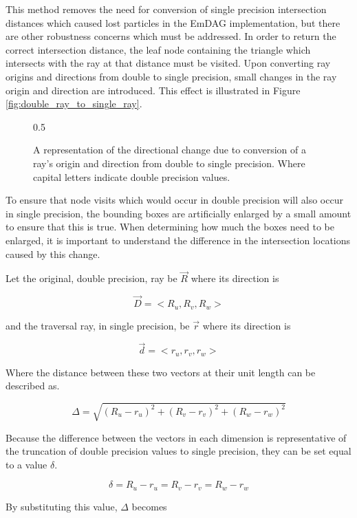 This method removes the need for conversion of single precision intersection
distances which caused lost particles in the EmDAG implementation, but there are
other robustness concerns which must be addressed. In order to return the
correct intersection distance, the leaf node containing the triangle which
intersects with the ray at that distance must be visited. Upon converting ray
origins and directions from double to single precision, small changes in the ray
origin and direction are introduced. This effect is illustrated in Figure
\ref{fig:double_ray_to_single_ray}.

\begin{figure}
  \begin{center}
  {0.5\textwidth}
  \caption{A representation of the directional change due to conversion of a
    ray's origin and direction from double to single precision. Where capital
    letters indicate double precision values.}
  \end{center}
  \label{fig:double_to_single_ray}
\end{figure}

To ensure that node visits which would occur in double precision will also occur
in single precision, the bounding boxes are artificially enlarged by a small
amount to ensure that this is true. When determining how much the boxes need to
be enlarged, it is important to understand the difference in the intersection
locations caused by this change.

Let the original, double precision, ray be $\vec{R}$ where its direction is

$$ \vec{D} = < R_{u}, R_{v}, R_{w} > $$

and the traversal ray, in single precision, be $\vec{r}$ where its direction is

$$ \vec{d} = < r_{u}, r_{v}, r_{w} > $$

Where the distance between these two vectors at their unit length
can be described as.

$$ \Delta = \sqrt{ (R_{u} - r_{u})^{2} + (R_{v} - r_{v})^{2} + (R_{w} -
  r_{w})^{2} } $$

Because the difference between the vectors in each dimension is representative
of the truncation of double precision values to single precision, they can be
set equal to a value $\delta$.

$$ \delta = R_{u} - r_{u} = R_{v} - r_{v} = R_{w} -  r_{w} $$

By substituting this value, $\Delta$ becomes

